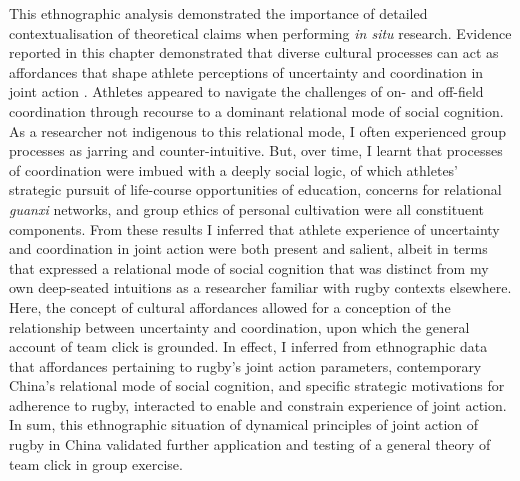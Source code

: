 This ethnographic analysis demonstrated the importance of detailed contextualisation of theoretical claims when performing \textit{in situ} research.  Evidence reported in this chapter demonstrated that diverse cultural processes can act as affordances that shape athlete perceptions of uncertainty and coordination in joint action \citep{Ramstead2016}.  Athletes appeared to navigate the challenges of on- and off-field coordination through recourse to a dominant relational mode of social cognition.  As a researcher not indigenous to this relational mode, I often experienced group processes as jarring and counter-intuitive.  But, over time, I learnt that processes of coordination were imbued with a deeply social logic, of which athletes' strategic pursuit of life-course opportunities of education, concerns for relational \textit{guanxi} networks, and group ethics of personal cultivation were all constituent components.  From these results I inferred that athlete experience of uncertainty and coordination in joint action were both present and salient, albeit in terms that expressed a relational mode of social cognition that was distinct from my own deep-seated intuitions as a researcher familiar with rugby contexts elsewhere. Here, the concept of cultural affordances \citep{Ramstead2016} allowed for a conception of the relationship between uncertainty and coordination, upon which the general account of team click is grounded.  In effect, I inferred from ethnographic data that affordances pertaining to rugby's joint action parameters, contemporary China's relational mode of social cognition, and specific strategic motivations for adherence to rugby, interacted to enable and constrain experience of joint action. In sum, this ethnographic situation of dynamical principles of joint action of rugby in China validated further application and testing of a general theory of team click in group exercise.


